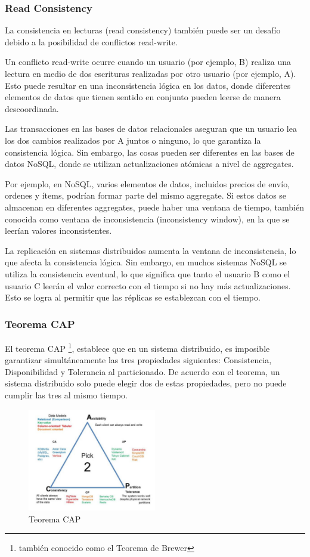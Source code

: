 \documentclass{article}
\begin{document}
		\subsubsection{Read Consistency}
		La consistencia en lecturas (read consistency) también puede ser un desafío debido a la posibilidad de conflictos read-write.
		
		Un conflicto read-write ocurre cuando un usuario (por ejemplo, B) realiza una lectura en medio de dos escrituras realizadas por otro usuario (por ejemplo, A). Esto puede resultar en una inconsistencia lógica en los datos, donde diferentes elementos de datos que tienen sentido en conjunto pueden leerse de manera descoordinada.
		
		Las transacciones en las bases de datos relacionales aseguran que un usuario lea los dos cambios realizados por A juntos o ninguno, lo que garantiza la consistencia lógica. Sin embargo, las cosas pueden ser diferentes en las bases de datos NoSQL, donde se utilizan actualizaciones atómicas a nivel de aggregates.
		
		Por ejemplo, en NoSQL, varios elementos de datos, incluidos precios de envío, ordenes y ítems, podrían formar parte del mismo aggregate. Si estos datos se almacenan en diferentes aggregates, puede haber una ventana de tiempo, también conocida como ventana de inconsistencia (inconsistency window), en la que se leerían valores inconsistentes.
		
		La replicación en sistemas distribuidos aumenta la ventana de inconsistencia, lo que afecta la consistencia lógica. Sin embargo, en muchos sistemas NoSQL se utiliza la consistencia eventual, lo que significa que tanto el usuario B como el usuario C leerán el valor correcto con el tiempo si no hay más actualizaciones. Esto se logra al permitir que las réplicas se establezcan con el tiempo.
		
		
		\subsubsection{Teorema CAP}
		El teorema CAP \footnote{también conocido como el Teorema de Brewer}, establece que en un sistema distribuido, es imposible garantizar simultáneamente las tres propiedades siguientes: Consistencia, Disponibilidad y Tolerancia al particionado. De acuerdo con el teorema, un sistema distribuido solo puede elegir dos de estas propiedades, pero no puede cumplir las tres al mismo tiempo.
		\begin{figure}[h]
			\centering
			\includegraphics[width=0.5\textwidth]{teorema_cap.png}
			\caption{Teorema CAP}
		\end{figure}
		
\end{document}
